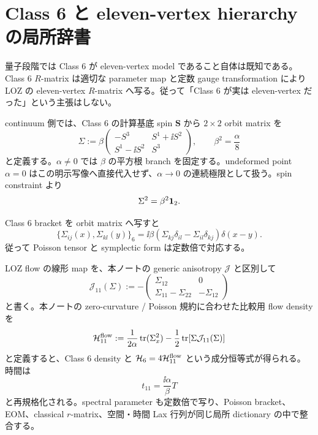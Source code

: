 \section{Class 6 と eleven-vertex hierarchy の局所辞書}
量子段階では Class 6 が eleven-vertex model であること自体は既知である\cite{CdL2024}。Class 6 $R$-matrix は適切な parameter map と定数 gauge transformation により LOZ の eleven-vertex $R$-matrix へ写る\cite{LOZ2014}。従って「Class 6 が実は eleven-vertex だった」という主張はしない。

continuum 側では、Class 6 の計算基底 spin $\boldsymbol S$ から $2\times2$ orbit matrix を
\begin{equation}
\Sigma:=\beta
\begin{pmatrix}
-S^3&S^1+\ii S^2\\S^1-\ii S^2&S^3
\end{pmatrix},
\qquad \beta^2=\frac\alpha8
\label{eq:Sigma6}
\end{equation}
と定義する。$\alpha\neq0$ では $\beta$ の平方根 branch を固定する。undeformed point $\alpha=0$ はこの明示写像へ直接代入せず、$\alpha\to0$ の連続極限として扱う。spin constraint より
\begin{equation}
\Sigma^2=\beta^2\mathbf 1_{2}.
\end{equation}

Class 6 bracket を orbit matrix へ写すと
\begin{equation}
\{\Sigma_{ij}(x),\Sigma_{kl}(y)\}_6
=\ii\beta(\Sigma_{kj}\delta_{il}-\Sigma_{il}\delta_{kj})\delta(x-y).
\label{eq:SigmaPB}
\end{equation}
従って Poisson tensor と symplectic form は定数倍で対応する。

LOZ flow の線形 map を、本ノートの generic anisotropy $\mathcal J$ と区別して
\begin{equation}
\mathcal J_{11}(\Sigma):=-
\begin{pmatrix}\Sigma_{12}&0\\\Sigma_{11}-\Sigma_{22}&-\Sigma_{12}\end{pmatrix}
\label{eq:J11}
\end{equation}
と書く。本ノートの zero-curvature / Poisson 規約に合わせた比較用 flow density を
\begin{equation}
\mathcal H_{11}^{\rm flow}:=\frac1{2\alpha}\operatorname{tr}(\Sigma_x^2)-\frac12\operatorname{tr}[\Sigma\mathcal J_{11}(\Sigma)]
\label{eq:H11flow}
\end{equation}
と定義すると、Class 6 density と $\mathcal H_6=4\mathcal H_{11}^{\rm flow}$ という成分恒等式が得られる。時間は
\begin{equation}
t_{11}=\frac{\ii\alpha}{\beta}T
\label{eq:t11}
\end{equation}
と再規格化される。spectral parameter も定数倍で写り、Poisson bracket、EOM、classical $r$-matrix、空間・時間 Lax 行列が同じ局所 dictionary の中で整合する。

